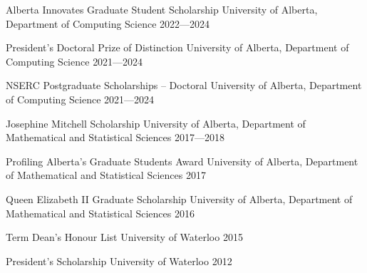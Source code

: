 \begin{cvhonors}
  \cvhonor
    {Alberta Innovates Graduate Student Scholarship}
    {University of Alberta, Department of Computing Science}
    {2022---2024}

  \cvhonor
    {President’s Doctoral Prize of Distinction}
    {University of Alberta, Department of Computing Science}
    {2021---2024}

  \cvhonor
    {NSERC Postgraduate Scholarships – Doctoral}
    {University of Alberta, Department of Computing Science}
    {2021---2024}

  \cvhonor
    {Josephine Mitchell Scholarship}
    {University of Alberta, Department of Mathematical and Statistical Sciences}
    {2017---2018}

  \cvhonor
    {Profiling Alberta's Graduate Students Award}
    {University of Alberta, Department of Mathematical and Statistical Sciences}
    {2017}

  \cvhonor
    {Queen Elizabeth II Graduate Scholarship}
    {University of Alberta, Department of Mathematical and Statistical Sciences}
    {2016}

  \cvhonor
    {Term Dean's Honour List}
    {University of Waterloo}
    {2015}

  \cvhonor
    {President's Scholarship}
    {University of Waterloo}
    {2012}

\end{cvhonors}
